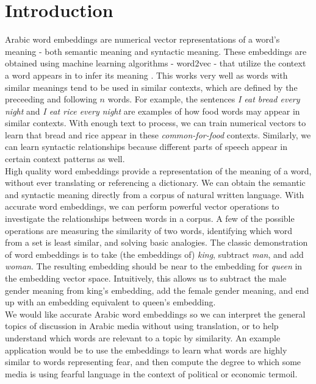 \section{Introduction}


Arabic word embeddings are numerical vector representations of a word's meaning - both semantic meaning and syntactic meaning. These embeddings are obtained using machine learning algorithms - word2vec - that utilize the context a word appears in to infer its meaning \cite{mikolovdist:2013, mikoloveffic:2013}. This works very well as words with similar meanings tend to be used in similar contexts, which are defined by the preceeding and following $n$ words. For example, the sentences \textit{I eat bread every night} and \textit{I eat rice every night} are examples of how food words may appear in similar contexts. With enough text to process, we can train numerical vectors to learn that bread and rice appear in these \textit{common-for-food} contexts. Similarly, we can learn syntactic relationships because different parts of speech appear in certain context patterns as well.
\\
High quality word embeddings provide a representation of the meaning of a word, without ever translating or referencing a dictionary. We can obtain the semantic and syntactic meaning directly from a corpus of natural written language. With accurate word embeddings, we can perform powerful vector operations to investigate the relationships between words in a corpus. A few of the possible operations are measuring the similarity of two words, identifying which word from a set is least similar, and solving basic analogies. The classic demonstration of word embeddings is to take (the embeddings of) \textit{king}, subtract \textit{man}, and add \textit{woman}. The resulting embedding should be near to the embedding for \textit{queen} in the embedding vector space. Intuitively, this allows us to subtract the male gender meaning from king's embedding, add the female gender meaning, and end up with an embedding equivalent to queen's embedding.
\\
We would like accurate Arabic word embeddings so we can interpret the general topics of discussion in Arabic media without using translation, or to help understand which words are relevant to a topic by similarity. An example application would be to use the embeddings to learn what words are highly similar to words representing fear, and then compute the degree to which some media is using fearful language in the context of political or economic termoil.
